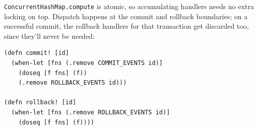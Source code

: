 \texttt{ConcurrentHashMap.compute} is atomic, so accumulating handlers needs
no extra locking on top. Dispatch happens at the commit and rollback
boundaries; on a successful commit, the rollback handlers for that
transaction get discarded too, since they'll never be needed:

\begin{listing}[H]
  \begin{verbatim}
(defn commit! [id]
  (when-let [fns (.remove COMMIT_EVENTS id)]
    (doseq [f fns] (f))
    (.remove ROLLBACK_EVENTS id)))

(defn rollback! [id]
  (when-let [fns (.remove ROLLBACK_EVENTS id)]
    (doseq [f fns] (f))))
\end{verbatim}
  \caption{Dispatch at commit and rollback boundaries.}
  \label{lst:dispatch}
\end{listing}